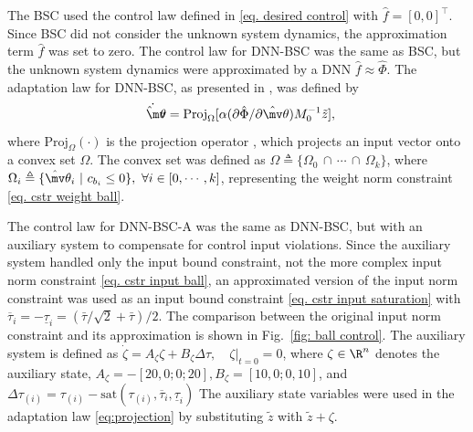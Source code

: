 \documentclass[lettersize,journal]{IEEEtran}
\newcommand*{\wth}{\mv\theta}
\begin{document}
The BSC used the control law defined in \eqref{eq. desired control} with $\hat f=[0,0]^\top$. Since BSC did not consider the unknown system dynamics, the approximation term $\hat f$ was set to zero.
The control law for DNN-BSC was the same as BSC, but the unknown system dynamics were approximated by a DNN \ie $\hat f\approx \hat\Phi$. The adaptation law for DNN-BSC, as presented in \cite{RN16}, was defined by 
\begin{equation}\label{eq:projection}
\dot {\hat\wth}= \text{Proj}_{\Omega}[\alpha  (\partial \hat\Phi/\partial \hat\wth)M_0^{-1}{\tilde z}],
\end{equation}
where $\text{Proj}_{\Omega}(\cdot)$ is the projection operator \cite[Appendix E, eq.~(E.4)]{RN20}, which projects an input vector onto a convex set $\Omega$. The convex set was defined as ${\Omega}\triangleq \{\Omega_0\,\cap\,\cdots\,\cap\, \Omega_k\}$, where $\Omega_i\triangleq \{\hat\wth_i\ \vert \ c_{b_i}\le 0\}, \ \forall i\in[0,\cdots, k]$, representing the weight norm constraint \eqref{eq. cstr weight ball}.

The control law for DNN-BSC-A was the same as DNN-BSC, but with an auxiliary system to compensate for control input violations. Since the auxiliary system handled only the input bound constraint, not the more complex input norm constraint \eqref{eq. cstr input ball}, an approximated version of the input norm constraint was used as an input bound constraint \eqref{eq. cstr input saturation} with ${\overline\tau_i} = -{\underline\tau_i} = (\bar\tau/\sqrt{2}+\bar\tau)/2$. The comparison between the original input norm constraint and its approximation is shown in Fig.~\ref{fig: ball control}.
The auxiliary system is defined as $\dot\zeta = A_\zeta \zeta + B_\zeta \Delta\tau,\quad \zeta\vert_{t=0} = 0$, where $\zeta\in\R^n$ denotes the auxiliary state, $A_\zeta=-[20,0;0;20],B_\zeta=[10,0;0,10]$, and $\Delta\tau_{(i)} = 
\tau_{(i)}-\text{sat}(\tau_{(i)},{\overline\tau_i},{\underline\tau_i})$
The auxiliary state variables were used in the adaptation law \eqref{eq:projection} by substituting ${\tilde z}$ with ${\tilde z}+\zeta$.
\end{document}
